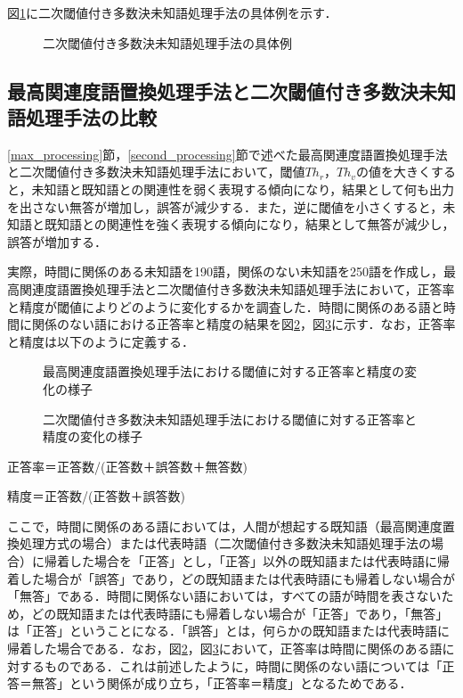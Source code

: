 図\ref{second_association}に二次閾値付き多数決未知語処理手法の具体例を示す．

\begin{figure}[t]
\caption{二次閾値付き多数決未知語処理手法の具体例}
\label{second_association}
\end{figure}


\subsection{最高関連度語置換処理手法と二次閾値付き多数決未知語処理手法の比較}\label{max_second_processing}
\ref{max_processing}節，\ref{second_processing}節で述べた最高関連度語置換処理手法と二次閾値付き多数決未知語処理手法において，閾値$Th_r$，$Th_v$の値を大きくすると，未知語と既知語との関連性を弱く表現する傾向になり，結果として何も出力を出さない無答が増加し，誤答が減少する．また，逆に閾値を小さくすると，未知語と既知語との関連性を強く表現する傾向になり，結果として無答が減少し，誤答が増加する．

実際，時間に関係のある未知語を190語，関係のない未知語を250語を作成し，最高関連度語置換処理手法と二次閾値付き多数決未知語処理手法において，正答率と精度が閾値によりどのように変化するかを調査した．時間に関係のある語と時間に関係のない語における正答率と精度の結果を図\ref{max_association_result}，図\ref{second_association_result}に示す．なお，正答率と精度は以下のように定義する．

\begin{figure}[b]
\caption{最高関連度語置換処理手法における閾値に対する正答率と精度の変化の様子}
\label{max_association_result}
\end{figure}

\begin{figure}[b]
\caption{二次閾値付き多数決未知語処理手法における閾値に対する正答率と精度の変化の様子}
\label{second_association_result}
\end{figure}


正答率＝正答数/(正答数＋誤答数＋無答数)

精度＝正答数/(正答数＋誤答数)

ここで，時間に関係のある語においては，人間が想起する既知語（最高関連度置換処理方式の場合）または代表時語（二次閾値付き多数決未知語処理手法の場合）に帰着した場合を「正答」とし，「正答」以外の既知語または代表時語に帰着した場合が「誤答」であり，どの既知語または代表時語にも帰着しない場合が「無答」である．時間に関係ない語においては，すべての語が時間を表さないため，どの既知語または代表時語にも帰着しない場合が「正答」であり，「無答」は「正答」ということになる．「誤答」とは，何らかの既知語または代表時語に帰着した場合である．なお，図\ref{max_association_result}，図\ref{second_association_result}において，正答率は時間に関係のある語に対するものである．これは前述したように，時間に関係のない語については「正答＝無答」という関係が成り立ち，「正答率＝精度」となるためである．


